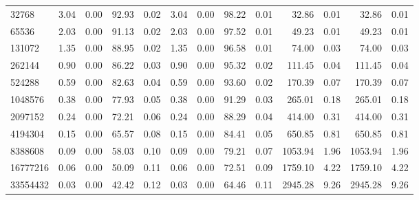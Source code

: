\begin{tabular}{lrrrrrrrrrrrr}
32768      &        3.04 &        0.00 &         92.93 &          0.02 &           3.04 &           0.00 &        98.22 &         0.01 &            32.86 &             0.01 &           32.86 &            0.01 \\
65536      &        2.03 &        0.00 &         91.13 &          0.02 &           2.03 &           0.00 &        97.52 &         0.01 &            49.23 &             0.01 &           49.23 &            0.01 \\
131072     &        1.35 &        0.00 &         88.95 &          0.02 &           1.35 &           0.00 &        96.58 &         0.01 &            74.00 &             0.03 &           74.00 &            0.03 \\
262144     &        0.90 &        0.00 &         86.22 &          0.03 &           0.90 &           0.00 &        95.32 &         0.02 &           111.45 &             0.04 &          111.45 &            0.04 \\
524288     &        0.59 &        0.00 &         82.63 &          0.04 &           0.59 &           0.00 &        93.60 &         0.02 &           170.39 &             0.07 &          170.39 &            0.07 \\
1048576    &        0.38 &        0.00 &         77.93 &          0.05 &           0.38 &           0.00 &        91.29 &         0.03 &           265.01 &             0.18 &          265.01 &            0.18 \\
2097152    &        0.24 &        0.00 &         72.21 &          0.06 &           0.24 &           0.00 &        88.29 &         0.04 &           414.00 &             0.31 &          414.00 &            0.31 \\
4194304    &        0.15 &        0.00 &         65.57 &          0.08 &           0.15 &           0.00 &        84.41 &         0.05 &           650.85 &             0.81 &          650.85 &            0.81 \\
8388608    &        0.09 &        0.00 &         58.03 &          0.10 &           0.09 &           0.00 &        79.21 &         0.07 &          1053.94 &             1.96 &         1053.94 &            1.96 \\
16777216   &        0.06 &        0.00 &         50.09 &          0.11 &           0.06 &           0.00 &        72.51 &         0.09 &          1759.10 &             4.22 &         1759.10 &            4.22 \\
33554432   &        0.03 &        0.00 &         42.42 &          0.12 &           0.03 &           0.00 &        64.46 &         0.11 &          2945.28 &             9.26 &         2945.28 &            9.26 \\

\end{tabular}
